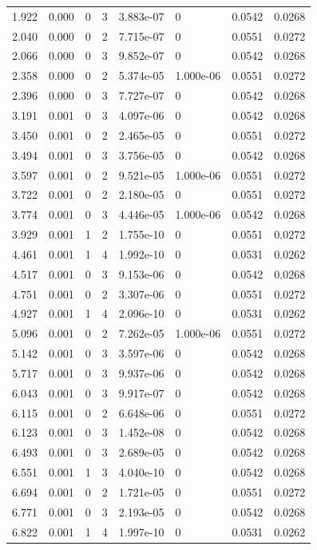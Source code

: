 \documentclass[preview]{standalone}
\begin{document}
{{\begin{tabular}{L{1.2cm}C{1.2cm} C{0.3cm}C{0.5cm} C{1.4cm}C{1.4cm} C{1.4cm}C{1.4cm}}
  1.922  &  0.000  & 0     &  3 &  3.883e-07  & 0  & 0.0542 &  0.0268   \\ 
  2.040  &  0.000  & 0     &  2 &  7.715e-07  & 0  & 0.0551 &  0.0272   \\ 
  2.066  &  0.000  & 0     &  3 &  9.852e-07  & 0  & 0.0542 &  0.0268   \\ 
  2.358  &  0.000  & 0     &  2 &  5.374e-05  & 1.000e-06  & 0.0551 &  0.0272   \\ 
  2.396  &  0.000  & 0     &  3 &  7.727e-07  & 0  & 0.0542 &  0.0268   \\ 
  3.191  &  0.001  & 0     &  3 &  4.097e-06  & 0  & 0.0542 &  0.0268   \\ 
  3.450  &  0.001  & 0     &  2 &  2.465e-05  & 0  & 0.0551 &  0.0272   \\ 
  3.494  &  0.001  & 0     &  3 &  3.756e-05  & 0  & 0.0542 &  0.0268   \\ 
  3.597  &  0.001  & 0     &  2 &  9.521e-05  & 1.000e-06  & 0.0551 &  0.0272   \\ 
  3.722  &  0.001  & 0     &  2 &  2.180e-05  & 0  & 0.0551 &  0.0272   \\ 
  3.774  &  0.001  & 0     &  3 &  4.446e-05  & 1.000e-06  & 0.0542 &  0.0268   \\ 
  3.929  &  0.001  & 1     &  2 &  1.755e-10  & 0  & 0.0551 &  0.0272   \\ 
  4.461  &  0.001  & 1     &  4 &  1.992e-10  & 0  & 0.0531 &  0.0262   \\ 
  4.517  &  0.001  & 0     &  3 &  9.153e-06  & 0  & 0.0542 &  0.0268   \\ 
  4.751  &  0.001  & 0     &  2 &  3.307e-06  & 0  & 0.0551 &  0.0272   \\ 
  4.927  &  0.001  & 1     &  4 &  2.096e-10  & 0  & 0.0531 &  0.0262   \\ 
  5.096  &  0.001  & 0     &  2 &  7.262e-05  & 1.000e-06  & 0.0551 &  0.0272   \\ 
  5.142  &  0.001  & 0     &  3 &  3.597e-06  & 0  & 0.0542 &  0.0268   \\ 
  5.717  &  0.001  & 0     &  3 &  9.937e-06  & 0  & 0.0542 &  0.0268   \\ 
  6.043  &  0.001  & 0     &  3 &  9.917e-07  & 0  & 0.0542 &  0.0268   \\ 
  6.115  &  0.001  & 0     &  2 &  6.648e-06  & 0  & 0.0551 &  0.0272   \\ 
  6.123  &  0.001  & 0     &  3 &  1.452e-08  & 0  & 0.0542 &  0.0268   \\ 
  6.493  &  0.001  & 0     &  3 &  2.689e-05  & 0  & 0.0542 &  0.0268   \\ 
  6.551  &  0.001  & 1     &  3 &  4.040e-10  & 0  & 0.0542 &  0.0268   \\ 
  6.694  &  0.001  & 0     &  2 &  1.721e-05  & 0  & 0.0551 &  0.0272   \\ 
  6.771  &  0.001  & 0     &  3 &  2.193e-05  & 0  & 0.0542 &  0.0268   \\ 
  6.822  &  0.001  & 1     &  4 &  1.997e-10  & 0  & 0.0531 &  0.0262   \\ 
\hline 
\end{tabular} 

}}
\end{document}
